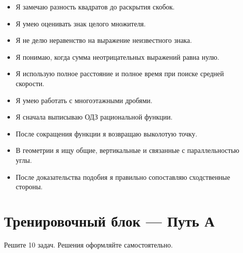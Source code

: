 \documentclass[a4paper,12pt]{article}
\begin{document}
\begin{itemize}

    \item[$\square$]
    Я замечаю разность квадратов до раскрытия скобок.

    \item[$\square$]
    Я умею оценивать знак целого множителя.

    \item[$\square$]
    Я не делю неравенство на выражение неизвестного знака.

    \item[$\square$]
    Я понимаю, когда сумма неотрицательных выражений равна нулю.

    \item[$\square$]
    Я использую полное расстояние и полное время
    при поиске средней скорости.

    \item[$\square$]
    Я умею работать с многоэтажными дробями.

    \item[$\square$]
    Я сначала выписываю ОДЗ рациональной функции.

    \item[$\square$]
    После сокращения функции я возвращаю выколотую точку.

    \item[$\square$]
    В геометрии я ищу общие, вертикальные
    и связанные с параллельностью углы.

    \item[$\square$]
    После доказательства подобия я правильно сопоставляю
    сходственные стороны.

\end{itemize}


\clearpage

\section*{\color{darkaccent}
Тренировочный блок --- Путь А
}

Решите 10 задач.
Решения оформляйте самостоятельно.
\end{document}
